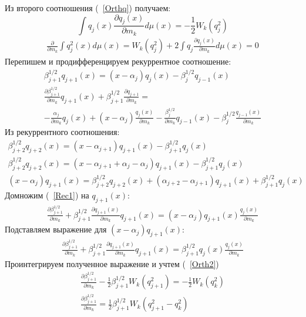 Из второго соотношения (~\ref{Orthq}) получаем:
\begin{equation}
\label{Orth2}
\int q_j(x)\frac{\partial q_j(x)}{\partial m_k}d\mu(x)=-\frac{1}{2}W_k(q_j^2)
\end{equation}
\begin{eqnarray}
\frac{\partial}{\partial m_k} \int q_j^2(x)d\mu(x)=W_k(q_j^2)+2\int{q_j\frac{\partial q_j(x)}{\partial m_k}d\mu(x)}=0 \nonumber
\end{eqnarray}
Перепишем и продифференцируем рекуррентное соотношение:
\begin{eqnarray}
\label{Rec1}
\beta_{j+1}^{1/2}q_{j+1}(x)=(x-\alpha_j)q_j(x)-\beta_{j}^{1/2}q_{j-1}(x) \nonumber \\
\frac {\partial \beta_{j+1}^{1/2}} {\partial m_k} q_{j+1}(x)+
\beta_{j+1}^{1/2} \frac {\partial q_{j+1}} {\partial m_k}= \nonumber \\
-\frac {\alpha_j} {\partial m_k} q_j(x)+
(x-\alpha_j)\frac {q_j(x)} {\partial m_k}-
\frac {\beta_j^{1/2}} {\partial m_k}q_{j-1}(x)
-\beta_j^{1/2}\frac {q_{j-1}(x)} {\partial m_k}
\end{eqnarray}
Из рекуррентного соотношения:
\begin{eqnarray}
\beta_{j+2}^{1/2}q_{j+2}(x)=(x-\alpha_{j+1})q_{j+1}(x)-\beta_{j+1}^{1/2}q_{j}(x) \nonumber \\
\beta_{j+2}^{1/2}q_{j+2}(x)=(x-\alpha_{j+1}+\alpha_j-\alpha_j)q_{j+1}(x)-\beta_{j+1}^{1/2}q_{j}(x) \nonumber \\
(x-\alpha_j)q_{j+1}(x)=\beta_{j+2}^{1/2}q_{j+2}(x)+(\alpha_{j+2}-\alpha_{j+1})q_{j+1}(x)+\beta_{j+1}^{1/2}q_{j}(x) \nonumber
\end{eqnarray}
Домножим (~\ref{Rec1}) на $q_{j+1}(x)$:
\begin{eqnarray}
\frac {\partial \beta_{j+1}^{1/2}} {\partial m_k}
+\beta_{j+1}^{1/2} \frac {\partial q_{j+1}(x) } {\partial m_k}q_{j+1}(x)
 = (x-\alpha_j)q_{j+1}(x)\frac {q_j(x)} {\partial m_k} \nonumber
\end{eqnarray}
Подставляем выражение для $(x-\alpha_j)q_{j+1}(x)$:
\begin{eqnarray}
\frac {\partial \beta_{j+1}^{1/2}} {\partial m_k}
+\beta_{j+1}^{1/2} \frac {\partial q_{j+1}(x) } {\partial m_k}q_{j+1}(x)
 =\beta_{j+1}^{1/2} q_{j}(x)\frac {q_j(x)} {\partial m_k} \nonumber
\end{eqnarray}
Проинтегрируем полученное выражение и учтем (~\ref{Orth2})
\begin{eqnarray}
\frac {\partial \beta_{j+1}^{1/2}} {\partial m_k}-\frac{1}{2}\beta_{j+1}^{1/2}W_k(q_{j+1}^2)=-\frac{1}{2}W_k(q_k^2) \nonumber \\
\frac {\partial \beta_{j+1}^{1/2}} {\partial m_k}=\frac{1}{2}\beta_{j+1}^{1/2}W_k(q_{j+1}^2-q_k^2) \nonumber
\end{eqnarray}
